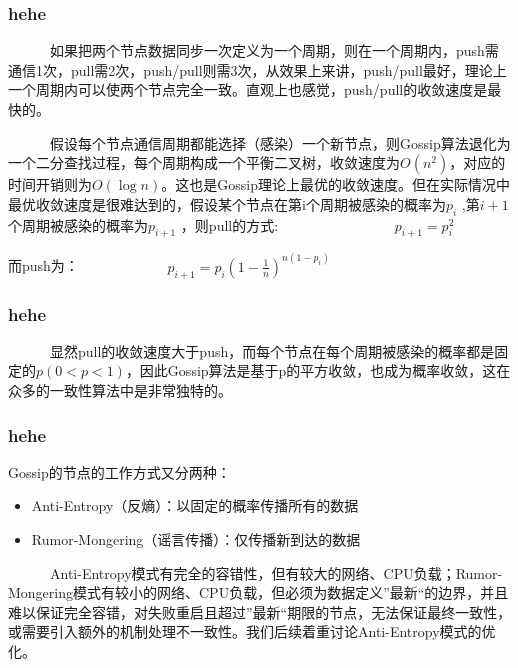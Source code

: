 \documentclass[slidestop,compress,mathserif,c]{beamer}
\begin{document}
\begin{frame}
\frametitle{hehe}
 ~~~~~~如果把两个节点数据同步一次定义为一个周期，则在一个周期内，push需通信1次，pull需2次，push/pull则需3次，从效果上来讲，push/pull最好，理论上一个周期内可以使两个节点完全一致。直观上也感觉，push/pull的收敛速度是最快的。

~~~~~~假设每个节点通信周期都能选择（感染）一个新节点，则Gossip算法退化为一个二分查找过程，每个周期构成一个平衡二叉树，收敛速度为$O(n^2)$，对应的时间开销则为$O(\log n)$。这也是Gossip理论上最优的收敛速度。但在实际情况中最优收敛速度是很难达到的，假设某个节点在第i个周期被感染的概率为$p_i$ ,第$i+1$个周期被感染的概率为$p_{i+1}$ ，则pull的方式:
~~~~~~~~~~~~~~~~$ p_{i+1} =p_i^2$

而push为：~~~~~~~~~~~~
$p_{i+1}=p_i(1-\frac{1}{n})^{n(1-p_i)}$
\end{frame}

\begin{frame}
\frametitle{hehe}
 ~~~~~~显然pull的收敛速度大于push，而每个节点在每个周期被感染的概率都是固定的$p(0<p<1)$，因此Gossip算法是基于p的平方收敛，也成为概率收敛，这在众多的一致性算法中是非常独特的。
\end{frame}

\begin{frame}
\frametitle{hehe}
 Gossip的节点的工作方式又分两种：
 \begin{itemize}
 \item Anti-Entropy（反熵）：以固定的概率传播所有的数据
 \item Rumor-Mongering（谣言传播）：仅传播新到达的数据
 \end{itemize}
 ~~~~~~Anti-Entropy模式有完全的容错性，但有较大的网络、CPU负载；Rumor-Mongering模式有较小的网络、CPU负载，但必须为数据定义”最新“的边界，并且难以保证完全容错，对失败重启且超过”最新“期限的节点，无法保证最终一致性，或需要引入额外的机制处理不一致性。我们后续着重讨论Anti-Entropy模式的优化。
\end{frame}
\end{document}
